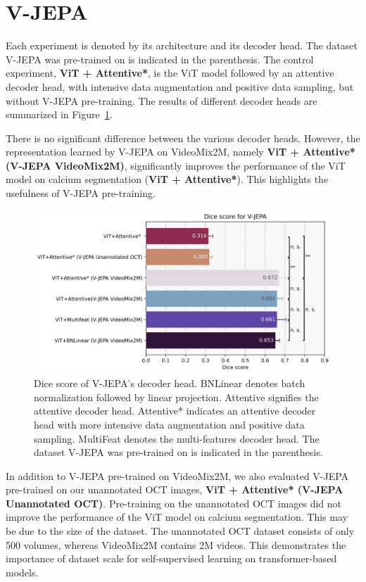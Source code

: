 \documentclass[a4paper,11pt,oneside]{report}
\begin{document}
\section{V-JEPA}
Each experiment is denoted by its architecture and its decoder head. The dataset V-JEPA was pre-trained on is indicated in the parenthesis. The control experiment, \textbf{ViT + Attentive*}, is the ViT model followed by an attentive decoder head, with intensive data augmentation and positive data sampling, but without V-JEPA pre-training. The results of different decoder heads are summarized in Figure~\ref{fig:vjepa-decoder-results}.

There is no significant difference between the various decoder heads. However, the representation learned by V-JEPA on VideoMix2M, namely \textbf{ViT + Attentive* (V-JEPA VideoMix2M)}, significantly improves the performance of the ViT model on calcium segmentation (\textbf{ViT + Attentive*}). This highlights the usefulness of V-JEPA pre-training.

\begin{figure}[hbt]
    \centering
    \includegraphics[width=0.75\linewidth]{figures/result_VJEPA_results.png}
    \caption{Dice score of V-JEPA's decoder head. BNLinear denotes batch normalization followed by linear projection. Attentive signifies the attentive decoder head. Attentive* indicates an attentive decoder head with more intensive data augmentation and positive data sampling. MultiFeat denotes the multi-features decoder head. The dataset V-JEPA was pre-trained on is indicated in the parenthesis.}
    \label{fig:vjepa-decoder-results}
\end{figure}

In addition to V-JEPA pre-trained on VideoMix2M, we also evaluated V-JEPA pre-trained on our unannotated OCT images, \textbf{ViT + Attentive* (V-JEPA Unannotated OCT)}. Pre-training on the unannotated OCT images did not improve the performance of the ViT model on calcium segmentation. This may be due to the size of the dataset. The unannotated OCT dataset consists of only 500 volumes, whereas VideoMix2M contains 2M videos. This demonstrates the importance of dataset scale for self-supervised learning on transformer-based models.
\end{document}
